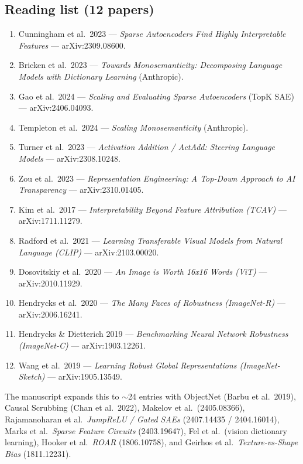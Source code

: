 \documentclass[11pt]{article}
\begin{document}
\subsection*{Reading list (12 papers)}
\begin{enumerate}[leftmargin=1.6em,itemsep=0pt]
  \item Cunningham et al.\ 2023 --- \emph{Sparse Autoencoders Find Highly Interpretable
    Features} --- arXiv:2309.08600.
  \item Bricken et al.\ 2023 --- \emph{Towards Monosemanticity: Decomposing Language
    Models with Dictionary Learning} (Anthropic).
  \item Gao et al.\ 2024 --- \emph{Scaling and Evaluating Sparse Autoencoders} (TopK
    SAE) --- arXiv:2406.04093.
  \item Templeton et al.\ 2024 --- \emph{Scaling Monosemanticity} (Anthropic).
  \item Turner et al.\ 2023 --- \emph{Activation Addition / ActAdd: Steering Language
    Models} --- arXiv:2308.10248.
  \item Zou et al.\ 2023 --- \emph{Representation Engineering: A Top-Down Approach to AI
    Transparency} --- arXiv:2310.01405.
  \item Kim et al.\ 2017 --- \emph{Interpretability Beyond Feature Attribution (TCAV)}
    --- arXiv:1711.11279.
  \item Radford et al.\ 2021 --- \emph{Learning Transferable Visual Models from Natural
    Language (CLIP)} --- arXiv:2103.00020.
  \item Dosovitskiy et al.\ 2020 --- \emph{An Image is Worth 16x16 Words (ViT)} ---
    arXiv:2010.11929.
  \item Hendrycks et al.\ 2020 --- \emph{The Many Faces of Robustness (ImageNet-R)} ---
    arXiv:2006.16241.
  \item Hendrycks \& Dietterich 2019 --- \emph{Benchmarking Neural Network Robustness
    (ImageNet-C)} --- arXiv:1903.12261.
  \item Wang et al.\ 2019 --- \emph{Learning Robust Global Representations
    (ImageNet-Sketch)} --- arXiv:1905.13549.
\end{enumerate}
The manuscript expands this to $\sim$24 entries with ObjectNet (Barbu et al.\ 2019),
Causal Scrubbing (Chan et al.\ 2022), Makelov et al.\ (2405.08366), Rajamanoharan
et al.\ \emph{JumpReLU / Gated SAEs} (2407.14435 / 2404.16014), Marks et al.\ \emph{Sparse
Feature Circuits} (2403.19647), Fel et al.\ (vision dictionary learning), Hooker et al.\
\emph{ROAR} (1806.10758), and Geirhos et al.\ \emph{Texture-vs-Shape Bias} (1811.12231).
\end{document}
